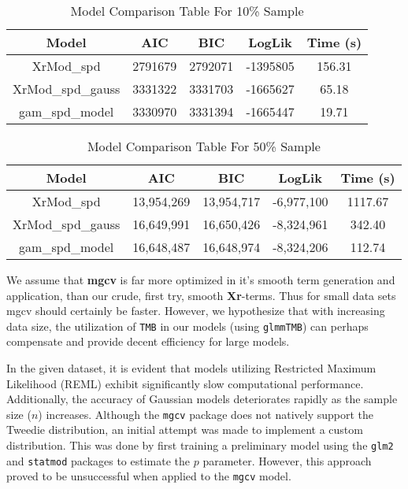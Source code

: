 \begin{table}[h]
    \centering
    \caption{Model Comparison Table For 10\% Sample}
    \label{tab:model_comparison_3}
    \begin{tabular}{|c|c|c|c|c|}
        \hline
        Model & AIC & BIC & LogLik & Time (s) \\
        \hline
        XrMod\_spd & 2791679 & 2792071 & -1395805 & 156.31 \\
        XrMod\_spd\_gauss & 3331322 & 3331703 & -1665627 & 65.18 \\
        gam\_spd\_model & 3330970 & 3331394 & -1665447 & 19.71 \\
        \hline
    \end{tabular}
\end{table}

\begin{table}[h]
\centering
\caption{Model Comparison Table For 50\% Sample}
\label{tab:model_comparison}
\begin{tabular}{|c|c|c|c|c|}
\hline
Model & AIC & BIC & LogLik & Time (s) \\
\hline
XrMod\_spd & 13,954,269 & 13,954,717 & -6,977,100 & 1117.67 \\
XrMod\_spd\_gauss & 16,649,991 & 16,650,426 & -8,324,961 & 342.40 \\
gam\_spd\_model & 16,648,487 & 16,648,974 & -8,324,206 & 112.74 \\
\hline
\end{tabular}
\end{table}

We assume that \textbf{mgcv} is far more optimized in it's smooth term generation and application, than our crude, first try, smooth \textbf{Xr}-terms. Thus for small data sets mgcv should certainly be faster. However, we hypothesize that with increasing data size, the utilization of \texttt{TMB} in our models (using \texttt{glmmTMB}) can perhaps compensate and provide decent efficiency for large models.  

In the given dataset, it is evident that models utilizing Restricted Maximum Likelihood (REML) exhibit significantly slow computational performance. Additionally, the accuracy of Gaussian models deteriorates rapidly as the sample size (\(n\)) increases. Although the \texttt{mgcv} package does not natively support the Tweedie distribution, an initial attempt was made to implement a custom distribution. This was done by first training a preliminary model using the \texttt{glm2} and \texttt{statmod} packages to estimate the \(p\) parameter. However, this approach proved to be unsuccessful when applied to the \texttt{mgcv} model.
\newline

